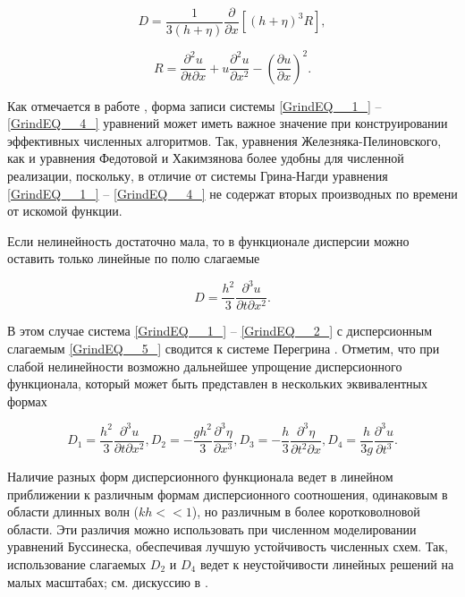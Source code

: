 \begin{equation} \label{GrindEQ__3_}
D=\frac{1}{3\left(h+\eta \right)} \frac{\partial }{\partial x} \left[\left(h+\eta \right)^{3} R\right],
\end{equation}

\begin{equation} \label{GrindEQ__4_}
R=\frac{\partial ^{2} u}{\partial t\partial x} +u\frac{\partial ^{2} u}{\partial x^{2} } -\left(\frac{\partial u}{\partial x} \right)^{2} .
\end{equation}


 Как отмечается в работе \cite{Fedotova_2008}, форма записи системы \eqref{GrindEQ__1_} -- \eqref{GrindEQ__4_} уравнений может иметь важное значение при конструировании эффективных численных алгоритмов. Так, уравнения Железняка-Пелиновского, как и уравнения Федотовой и Хакимзянова более удобны для численной реализации, поскольку, в отличие от системы Грина-Нагди уравнения \eqref{GrindEQ__1_} -- \eqref{GrindEQ__4_} не содержат вторых производных по времени от искомой функции.

Если нелинейность достаточно мала, то в функционале дисперсии можно оставить только линейные по полю слагаемые


\begin{equation} \label{GrindEQ__5_}
D=\frac{h^{2} }{3} \frac{\partial ^{3} u}{\partial t\partial x^{2} } .
\end{equation}


 В этом случае система \eqref{GrindEQ__1_} -- \eqref{GrindEQ__2_} с дисперсионным слагаемым \eqref{GrindEQ__5_} сводится к системе Перегрина \cite{Peregrinde}. Отметим, что при слабой нелинейности возможно дальнейшее упрощение дисперсионного функционала, который может быть представлен в нескольких эквивалентных формах


\begin{equation} \label{GrindEQ__6_}
D_{1} =\frac{h^{2} }{3} \frac{\partial ^{3} u}{\partial t\partial x^{2} } ,     D_{2} =-\frac{gh^{2} }{3} \frac{\partial ^{3} \eta }{\partial x^{3} } ,     D_{3} =-\frac{h}{3} \frac{\partial ^{3} \eta }{\partial t^{2} \partial x} ,     D_{4} =\frac{h}{3g} \frac{\partial ^{3} u}{\partial t^{3} } .
\end{equation}


Наличие разных форм дисперсионного функционала ведет в линейном приближении к различным формам дисперсионного соотношения, одинаковым в области длинных волн ($kh<<1$), но различным в более коротковолновой области. Эти различия можно использовать при численном моделировании уравнений Буссинеска, обеспечивая лучшую устойчивость численных схем. Так, использование слагаемых $D_2$ и $D_4$ ведет к неустойчивости линейных решений на малых масштабах; см. дискуссию в \cite{pel_2006}.

